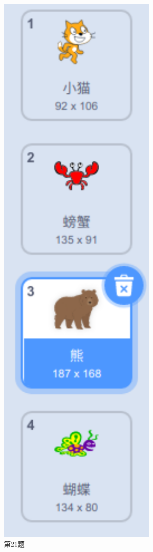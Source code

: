 \documentclass[10pt, a4paper]{article}
\begin{document}
\begin{enumerate}
\begin{figure}[htbp]
\begin{minipage}[t]{.1\textwidth}
                \includegraphics[width=0.7\textwidth]{21.png}
                \caption*{第21题}
            \end{minipage}
        \end{figure}


\end{enumerate}
\end{document}
